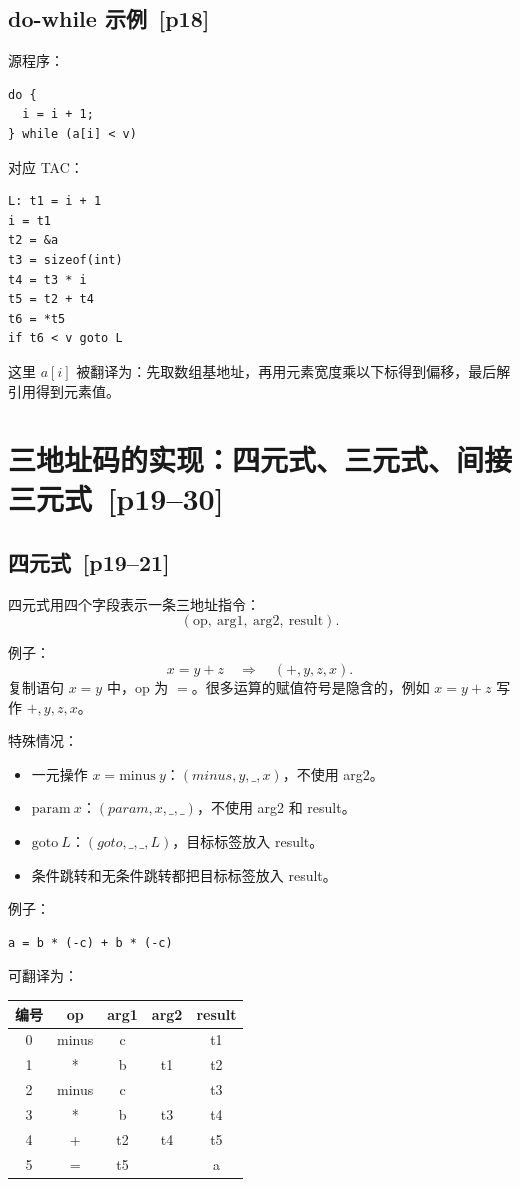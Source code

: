 \documentclass[UTF8,fontset=none,11pt]{ctexart}
\newenvironment{defbox}[1][]{%
  \par\medskip\noindent{\color{defrule}\rule{\linewidth}{1.1pt}}\par\nopagebreak
  \noindent{\bfseries\color{defrule}#1}\par\nopagebreak\smallskip}%
  {\par\nopagebreak\smallskip\noindent{\color{defrule}\rule{\linewidth}{0.4pt}}\par\medskip}
\newcommand{\pg}[1]{\texorpdfstring{{\small\color{graytext}\,[p#1]}}{ [p#1]}}
\begin{document}
\subsection{do-while 示例 \pg{18}}

源程序：
\begin{verbatim}
do {
  i = i + 1;
} while (a[i] < v)
\end{verbatim}

对应 TAC：
\begin{verbatim}
L: t1 = i + 1
i = t1
t2 = &a
t3 = sizeof(int)
t4 = t3 * i
t5 = t2 + t4
t6 = *t5
if t6 < v goto L
\end{verbatim}

这里 \(a[i]\) 被翻译为：先取数组基地址，再用元素宽度乘以下标得到偏移，最后解引用得到元素值。

\section{三地址码的实现：四元式、三元式、间接三元式 \pg{19--30}}

\subsection{四元式 \pg{19--21}}

\begin{defbox}[Quadruple]
四元式用四个字段表示一条三地址指令：
\[
(\mathrm{op},\ \mathrm{arg1},\ \mathrm{arg2},\ \mathrm{result}).
\]
\end{defbox}

例子：
\[
x=y+z \quad\Rightarrow\quad (+,y,z,x).
\]
复制语句 \(x=y\) 中，op 为 \(=\)。很多运算的赋值符号是隐含的，例如 \(x=y+z\) 写作 \(+,y,z,x\)。

特殊情况：

\begin{itemize}
  \item 一元操作 \(x=\mathrm{minus}\ y\)：\((minus,y,\_,x)\)，不使用 arg2。
  \item \(\mathrm{param}\ x\)：\((param,x,\_,\_)\)，不使用 arg2 和 result。
  \item \(\mathrm{goto}\ L\)：\((goto,\_,\_,L)\)，目标标签放入 result。
  \item 条件跳转和无条件跳转都把目标标签放入 result。
\end{itemize}

例子：
\begin{verbatim}
a = b * (-c) + b * (-c)
\end{verbatim}
可翻译为：
\begin{center}
\small
\begin{tabular}{c|cccc}
\toprule
编号 & op & arg1 & arg2 & result \\
\midrule
0 & minus & c &  & t1 \\
1 & * & b & t1 & t2 \\
2 & minus & c &  & t3 \\
3 & * & b & t3 & t4 \\
4 & + & t2 & t4 & t5 \\
5 & = & t5 &  & a \\
\bottomrule
\end{tabular}
\end{center}
\end{document}
